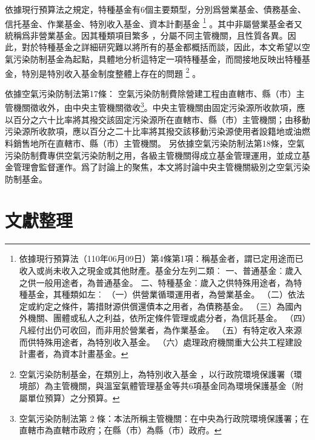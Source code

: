 \documentclass[12pt,a4paper]{article}
\begin{document}
依據現行預算法之規定，特種基金有6個主要類型，分別爲營業基金、債務基金、信托基金、作業基金、特別收入基金、資本計劃基金
\footnote{依據現行預算法（110年06月09日）第4條第1項：稱基金者，謂已定用途而已收入或尚未收入之現金或其他財產。基金分左列二類︰
一、普通基金︰歲入之供一般用途者，為普通基金。
二、特種基金︰歲入之供特殊用途者，為特種基金，其種類如左︰
（一）供營業循環運用者，為營業基金。
（二）依法定或約定之條件，籌措財源供償還債本之用者，為債務基金。
（三）為國內外機關、團體或私人之利益，依所定條件管理或處分者，為信託基金。
（四）凡經付出仍可收回，而非用於營業者，為作業基金。
（五）有特定收入來源而供特殊用途者，為特別收入基金。
（六）處理政府機關重大公共工程建設計畫者，為資本計畫基金。}
。其中非屬營業基金者又統稱爲非營業基金。因其種類項目繁多
，分屬不同主管機關，且性質各異。因此，對於特種基金之詳細研究難以將所有的基金都概括而談，因此，本文希望以空氣污染防制基金為起點，具體地分析這特定一項特種基金，而間接地反映出特種基金，特別是特別收入基金制度整體上存在的問題
\footnote{空氣污染防制基金，在類別上，為特別收入基金
，以行政院環境保護署（環境部）為主管機關，與溫室氣體管理基金等共6項基金同為環境保護基金（附屬單位預算）之分預算。}
。




依據空氣污染防制法第17條：
空氣污染防制費除營建工程由直轄市、縣（市）主管機關徵收外，由中央主管機關徵收\footnote{空氣污染防制法第 2 條：本法所稱主管機關：在中央為行政院環境保護署；在直轄市為直轄市政府；在縣（市）為縣（巿）政府。}。中央主管機關由固定污染源所收款項，應以百分之六十比率將其撥交該固定污染源所在直轄市、縣（市）主管機關；由移動污染源所收款項，應以百分之二十比率將其撥交該移動污染源使用者設籍地或油燃料銷售地所在直轄市、縣（市）主管機關。
另依據空氣污染防制法第18條，空氣污染防制費專供空氣污染防制之用，各級主管機關得成立基金管理運用，並成立基金管理會監督運作。爲了討論上的聚焦，本文將討論中央主管機關級別之空氣污染防制基金。



\section{文獻整理}
\end{document}
